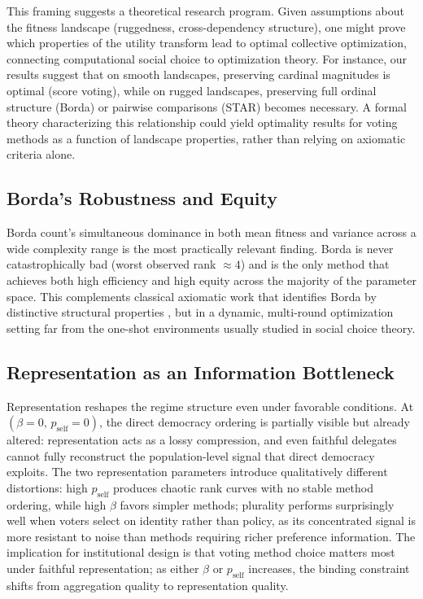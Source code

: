 This framing suggests a theoretical research program. Given assumptions about
the fitness landscape (ruggedness, cross-dependency structure), one might prove
which properties of the utility transform lead to optimal collective
optimization, connecting computational social choice to optimization theory.
For instance, our results suggest that on smooth landscapes, preserving cardinal
magnitudes is optimal (score voting), while on rugged landscapes, preserving
full ordinal structure (Borda) or pairwise comparisons (STAR) becomes necessary.
A formal theory characterizing this relationship could yield optimality results
for voting methods as a function of landscape properties, rather than relying on
axiomatic criteria alone.

\subsection{Borda's Robustness and Equity}

Borda count's simultaneous dominance in both mean fitness and variance across a wide complexity range is the most practically relevant finding. Borda is never catastrophically bad (worst observed rank $\approx 4$) and is the only method that achieves both high efficiency and high equity across the majority of the parameter space. This complements classical axiomatic work that identifies Borda by distinctive structural properties \citep{young1974axiom}, but in a dynamic, multi-round optimization setting far from the one-shot environments usually studied in social choice theory.

\subsection{Representation as an Information Bottleneck}

Representation reshapes the regime structure even under favorable conditions. At $(\beta = 0,\, p_{\mathrm{self}} = 0)$, the direct democracy ordering is partially visible but already altered: representation acts as a lossy compression, and even faithful delegates cannot fully reconstruct the population-level signal that direct democracy exploits. The two representation parameters introduce qualitatively different distortions: high $p_{\mathrm{self}}$ produces chaotic rank curves with no stable method ordering, while high $\beta$ favors simpler methods; plurality performs surprisingly well when voters select on identity rather than policy, as its concentrated signal is more resistant to noise than methods requiring richer preference information. The implication for institutional design is that voting method choice matters most under faithful representation; as either $\beta$ or $p_{\mathrm{self}}$ increases, the binding constraint shifts from aggregation quality to representation quality.

